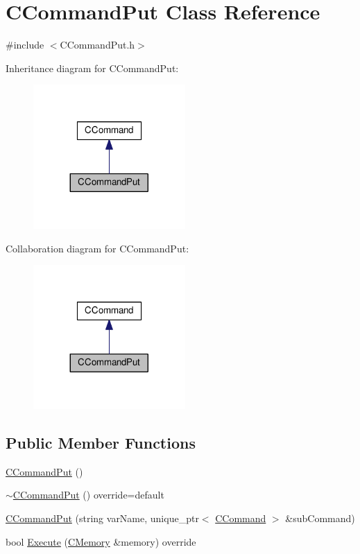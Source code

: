 \hypertarget{classCCommandPut}{}\section{C\+Command\+Put Class Reference}
\label{classCCommandPut}


{\ttfamily \#include $<$C\+Command\+Put.\+h$>$}



Inheritance diagram for C\+Command\+Put\+:\nopagebreak
\begin{figure}[H]
\begin{center}
\leavevmode
\includegraphics[width=164pt]{classCCommandPut__inherit__graph}
\end{center}
\end{figure}


Collaboration diagram for C\+Command\+Put\+:\nopagebreak
\begin{figure}[H]
\begin{center}
\leavevmode
\includegraphics[width=164pt]{classCCommandPut__coll__graph}
\end{center}
\end{figure}
\subsection*{Public Member Functions}
\begin{DoxyCompactItemize}
\item 
\hyperlink{classCCommandPut_a4d53bed5af461e55b837b580ee3976a3}{C\+Command\+Put} ()
\item 
\hyperlink{classCCommandPut_a0156ac693dff6dcf0080e183b95801a3}{$\sim$\+C\+Command\+Put} () override=default
\item 
\hyperlink{classCCommandPut_aef37d51baeb780525555ff2f5e9f5c09}{C\+Command\+Put} (string var\+Name, unique\+\_\+ptr$<$ \hyperlink{classCCommand}{C\+Command} $>$ \&sub\+Command)
\item 
bool \hyperlink{classCCommandPut_a4b82c56cf3d5aafc75701ec72f8f17dc}{Execute} (\hyperlink{classCMemory}{C\+Memory} \&memory) override
\end{DoxyCompactItemize}
